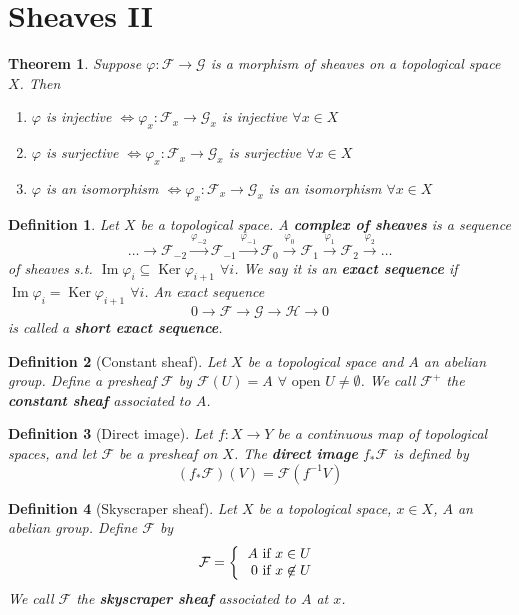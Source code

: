 \documentclass[a4paper]{article}
\newtheorem*{definition}{Definition}
\newtheorem{theorem}{Theorem}
\DeclareMathOperator{\Ima}{Im}
\DeclareMathOperator{\Ker}{Ker}
\begin{document}
\section{Sheaves II}
\begin{theorem}
	Suppose $\varphi:\mathcal{F}\to\mathcal{G}$ is a morphism of sheaves on a topological space $X$. Then
	\begin{enumerate}[label=\roman*.]
		\item $\varphi$ is injective $\iff \varphi_x:\mathcal{F}_x\to\mathcal{G}_x$ is injective $\forall x \in X$
		\item $\varphi$ is surjective $\iff \varphi_x:\mathcal{F}_x\to\mathcal{G}_x$ is surjective $\forall x \in X$
		\item $\varphi$ is an isomorphism $\iff \varphi_x:\mathcal{F}_x\to\mathcal{G}_x$ is an isomorphism $\forall x \in X$
	\end{enumerate}
\end{theorem}

\begin{definition}
	Let $X$ be a topological space. A \textbf{complex of sheaves} is a sequence
	$$\dots \to \mathcal{F}_{-2} \overset{\varphi_{-2}}{\to} \mathcal{F}_{-1} \overset{\varphi_{-1}}{\to} \mathcal{F}_0 \overset{\varphi_0}{\to} \mathcal{F}_1 \overset{\varphi_1}{\to} \mathcal{F}_2 \overset{\varphi_2}{\to} \dots$$
	of sheaves s.t. $\Ima \varphi_i \subseteq \Ker \varphi_{i+1}$ $\forall i$. We say it is an \textbf{exact sequence} if $\Ima \varphi_i = \Ker\varphi_{i+1}$ $\forall i$. An exact sequence
	$$0 \to \mathcal{F} \to \mathcal{G} \to \mathcal{H} \to 0$$
	is called a \textbf{short exact sequence}.
\end{definition}

\begin{definition}[Constant sheaf]
	Let $X$ be a topological space and $A$ an abelian group. Define a presheaf $\mathcal{F}$ by $\mathcal{F}(U)=A$ $\forall \text{ open } U \neq \emptyset$. We call $\mathcal{F}^+$ the \textbf{constant sheaf} associated to $A$.
\end{definition}

\begin{definition}[Direct image]
	Let $f:X\to Y$ be a continuous map of topological spaces, and let $\mathcal{F}$ be a presheaf on $X$. The \textbf{direct image} $f_*\mathcal{F}$ is defined by $$(f_*\mathcal{F})(V) = \mathcal{F}(f^{-1}V)$$
\end{definition}

\begin{definition}[Skyscraper sheaf]
	Let $X$ be a topological space, $x \in X$, $A$ an abelian group. Define $\mathcal{F}$ by \[\mathcal{F} = \left\{
	\begin{tabular}{r}
	$A$ if $x \in U$\\$0$ if $x \not\in U$
	\end{tabular}\right.
	\]
	We call $\mathcal{F}$ the \textbf{skyscraper sheaf} associated to $A$ at $x$.
\end{definition}
\end{document}

